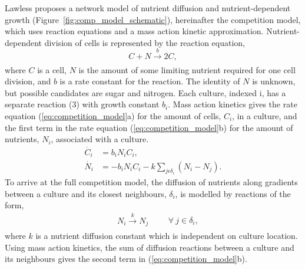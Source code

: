 Lawless proposes a network model of nutrient diffusion and
nutrient-dependent growth (Figure~\ref{fig:comp_model_schematic}),
hereinafter the competition model, which uses reaction equations and a
mass action kinetic approximation.
Nutrient-dependent division of cells is represented by the reaction
equation,
\begin{equation}
  \label{eq:reaction}
    C + N \xrightarrow[]{b} 2C,
\end{equation}
where \(C\) is a cell, \(N\) is the amount of some limiting nutrient
required for one cell division, and \(b\) is a rate constant for the
reaction. The identity of \(N\) is unknown, but possible candidates
are sugar and nitrogen. Each culture, indexed i, has a separate
reaction (3) with growth constant \(b_{i}\). Mass action kinetics
gives the rate equation (\ref{eq:competition_model}a) for the amount
of cells, \(C_{i}\), in a culture, and the first term in the rate
equation (\ref{eq:competition_model}b) for the amount of nutrients,
\(N_{i}\), associated with a culture.
\begin{subequations}
  \label{eq:competition_model}
  \begin{align}
         \dot{C_{i}}& = b_{i}N_{i}C_{i},\\
         \dot{N_{i}}& = - b_{i}N_{i}C_{i} - k\sum_{j \epsilon \delta_i}(N_{i} - N_{j}).
  \end{align}
\end{subequations}
To arrive at the full competition model, the diffusion of nutrients
along gradients between a culture and its closest neighbours,
\(\delta_{i}\), is modelled by reactions of the form,
\begin{equation}
  \label{eq:diffusion_reaction}
  \left.\begin{aligned}
  &N_{i} \xrightarrow[]{k} N_{j}
       \end{aligned}
 \right.
 \qquad \forall~j \in \delta_{i},
\end{equation}
where \(k\) is a nutrient diffusion constant which is independent on
culture location. Using mass action kinetics, the sum of diffusion
reactions between a culture and its neighbours gives the second term
in (\ref{eq:competition_model}b).



